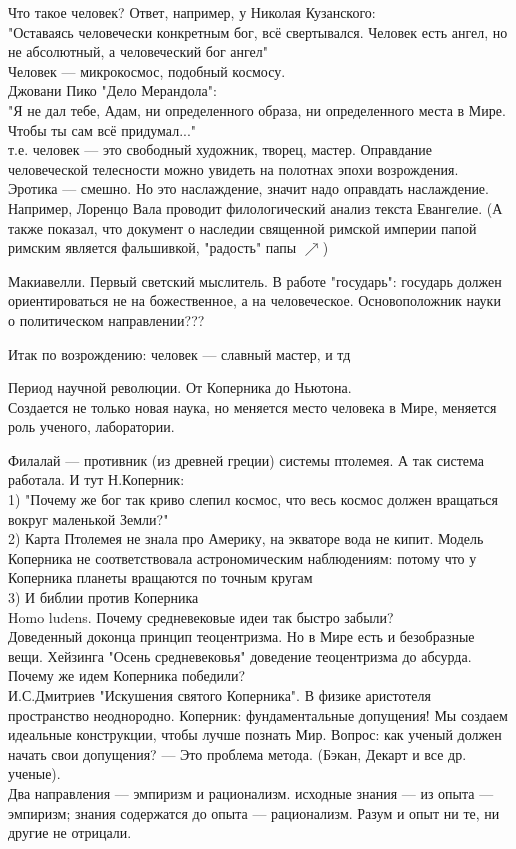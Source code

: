 \documentclass[a4paper,12pt]{article}
\begin{document}
Что такое человек? Ответ, например, у Николая Кузанского:\\
"Оставаясь человечески конкретным бог, всё свертывался. Человек есть ангел, но не абсолютный, а человеческий бог ангел"\\
Человек --- микрокосмос, подобный космосу.\\
Джовани Пико "Дело Мерандола":\\
"Я не дал тебе, Адам, ни определенного образа, ни определенного места в Мире. Чтобы ты сам всё придумал..."\\
т.е. человек --- это свободный художник, творец, мастер. Оправдание человеческой телесности можно увидеть на полотнах эпохи возрождения. Эротика --- смешно. Но это наслаждение, значит надо оправдать наслаждение. Например, Лоренцо Вала проводит филологический анализ текста Евангелие. (А также показал, что документ о наследии священной римской империи папой римским является фальшивкой, "радость" папы $\nearrow$)

Макиавелли. Первый светский мыслитель. В работе "государь": государь должен ориентироваться не на божественное, а на человеческое. Основоположник науки о политическом направлении???

Итак по возрождению: человек --- славный мастер, и тд

Период научной революции. От Коперника до Ньютона.\\
Создается не только новая наука, но меняется место человека в Мире, меняется роль ученого, лаборатории.

Филалай --- противник (из древней греции) системы птолемея. А так система работала. И тут Н.Коперник:\\
1) "Почему же бог так криво слепил космос, что весь космос должен вращаться вокруг маленькой Земли?"\\
2) Карта Птолемея не знала про Америку, на экваторе вода не кипит. Модель Коперника не соответствовала астрономическим наблюдениям: потому что у Коперника планеты вращаются по точным кругам\\
3) И библии против Коперника\\

Homo ludens. Почему средневековые идеи так быстро забыли?\\
Доведенный доконца принцип теоцентризма. Но в Мире есть и безобразные вещи. Хейзинга "Осень средневековья" доведение теоцентризма до абсурда.\\

Почему же идем Коперника победили?\\
И.С.Дмитриев "Искушения святого Коперника". В физике аристотеля пространство неоднородно. Коперник: фундаментальные допущения! Мы создаем идеальные конструкции, чтобы лучше познать Мир. Вопрос: как ученый должен начать свои допущения? --- Это проблема метода. (Бэкан, Декарт и все др. ученые).\\
Два направления --- эмпиризм и рационализм. исходные знания --- из опыта --- эмпиризм; знания содержатся до опыта --- рационализм. Разум и опыт ни те, ни другие не отрицали.
\end{document}
